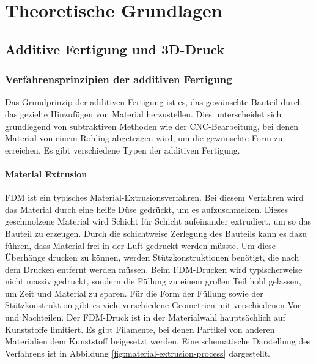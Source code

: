 \chapter{Theoretische Grundlagen} \label{chap:theoretical-foundations}

    \section{Additive Fertigung und 3D-Druck}\label{sec:additive-manufacturing-and-3d-printing}
        \subsection{Verfahrensprinzipien der additiven Fertigung}\label{subsec:principles-of-additive-manufacturing}
        Das Grundprinzip der additiven Fertigung ist es, das gewünschte Bauteil durch das gezielte Hinzufügen von Material herzustellen.
        Dies unterscheidet sich grundlegend von subtraktiven Methoden wie der \ac{CNC}-Bearbeitung,
        bei denen Material von einem Rohling abgetragen wird, um die gewünschte Form zu erreichen.
        Es gibt verschiedene Typen der additiven Fertigung.
        \cite{suzukiAdditiveManufacturingVs2024}
        \cite{gibsonAdditiveManufacturingTechnologies2010}
        \cite{yeshiwasReviewArticleAssessment2025}

            \subsubsection{Material Extrusion}
            \ac{FDM} ist ein typisches Material-Extrusionsverfahren.
            Bei diesem Verfahren wird das Material durch eine heiße Düse gedrückt, um es aufzuschmelzen.
            Dieses geschmolzene Material wird Schicht für Schicht aufeinander extrudiert, um so das Bauteil zu erzeugen.
            Durch die schichtweise Zerlegung des Bauteils kann es dazu führen, dass Material frei in der Luft gedruckt werden müsste.
            Um diese Überhänge drucken zu können, werden Stützkonstruktionen benötigt, die nach dem Drucken entfernt werden müssen.
            Beim \ac{FDM}-Drucken wird typischerweise nicht massiv gedruckt, sondern die Füllung zu einem großen Teil hohl gelassen,
            um Zeit und Material zu sparen.
            Für die Form der Füllung sowie der Stützkonstruktion gibt es viele verschiedene Geometrien mit verschiedenen Vor- und Nachteilen.
            Der \ac{FDM}-Druck ist in der Materialwahl hauptsächlich auf Kunststoffe limitiert.
            Es gibt Filamente, bei denen Partikel von anderen Materialien dem Kunststoff beigesetzt werden.
            Eine schematische Darstellung des Verfahrens ist in Abbildung \ref{fig:material-extrusion-process} dargestellt.
            \cite{MaterialExtrusionAdditive}
            \cite{gebhardtAdditiveFertigungsverfahrenAdditive2017}
            \cite{gibsonAdditiveManufacturingTechnologies2010}
            \cite{yeshiwasReviewArticleAssessment2025}

